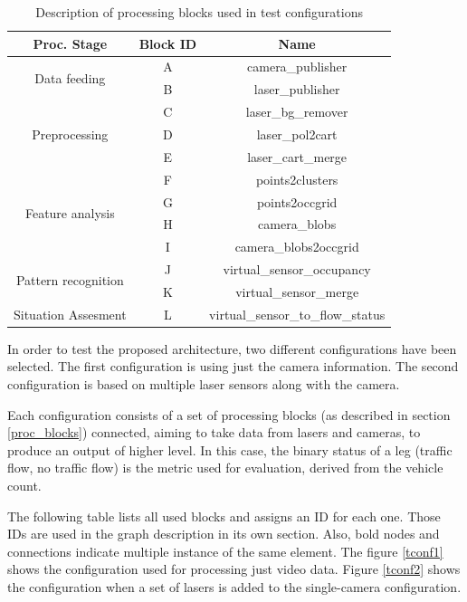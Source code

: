 \begin{table}[ht!]
\footnotesize
\centering
\begin{tabular}{|c | c| c|}
\hline
\textbf{Proc. Stage} & \textbf{Block ID} & \textbf{Name} \\
\hline

\multirow{2}{*}{Data feeding} &
A & camera\_publisher \\
\cline{2-3} 
& B & laser\_publisher \\
\hline

\multirow{3}{*}{Preprocessing} &
C & laser\_bg\_remover \\
\cline{2-3}
& D & laser\_pol2cart \\
\cline{2-3}
& E & laser\_cart\_merge \\
\hline

\multirow{4}{*}{Feature analysis} &
F & points2clusters \\
\cline{2-3}
& G & points2occgrid \\
\cline{2-3}
& H & camera\_blobs \\
\cline{2-3}
& I & camera\_blobs2occgrid \\
\hline

\multirow{2}{*}{Pattern recognition} &
J & virtual\_sensor\_occupancy \\
\cline{2-3}
& K & virtual\_sensor\_merge \\
\hline

Situation Assesment &
L & virtual\_sensor\_to\_flow\_status \\
\hline

\end{tabular}
\caption{Description of processing blocks used in test configurations}
\label{desc_test_config}
\end{table}

In order to test the proposed architecture, two different configurations have been selected. The first configuration is using just the camera information. The second configuration is based on multiple laser sensors along with the camera.

Each configuration consists of a set of processing blocks (as described in section \ref{proc_blocks}) connected, aiming to take data from  lasers and cameras, to produce an output of higher level. In this case, the binary status of a leg (traffic flow, no traffic flow) is the metric used for evaluation, derived from the vehicle count.

The following table lists all used blocks and assigns an ID for each one. Those IDs are used in the graph description in its own section. Also, bold nodes and connections indicate multiple instance of the same element. The figure \ref{tconf1} shows the  configuration used for processing just video data. Figure \ref{tconf2} shows the configuration when a set of lasers is added to the single-camera configuration.

